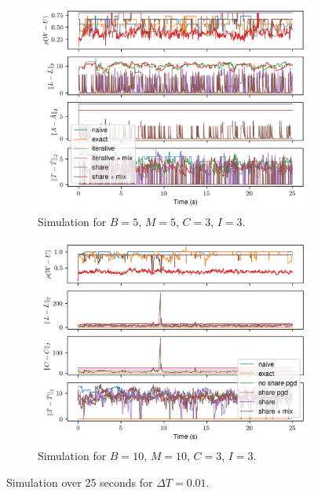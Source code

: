 \documentclass{article}
\begin{document}
\clearpage
\begin{figure}[h]
    \centering
    \begin{subfigure}{0.48\linewidth}
      \includegraphics[width=\linewidth]{tex/small.png}
      \caption{Simulation for $B = 5$, $M = 5$, $C = 3$, $I=3$.}
      \label{fig:small}
    \end{subfigure}%
    \begin{subfigure}{0.48\linewidth}
      \includegraphics[width=\linewidth]{tex/big.png}
      \caption{Simulation for $B = 10$, $M = 10$, $C = 3$, $I=3$.}
      \label{fig:big}
    \end{subfigure}
    \caption{Simulation over 25 seconds for $\Delta T = 0.01$.}
    \label{fig:eff}
\end{figure}
\end{document}
